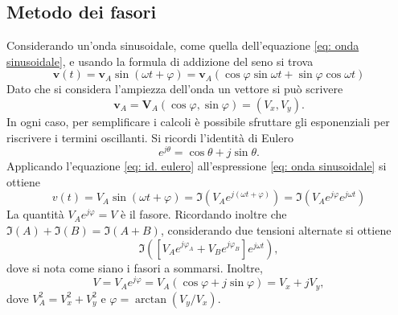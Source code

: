 \subsection{Metodo dei fasori}
Considerando un'onda sinusoidale, come quella dell'equazione \eqref{eq: onda sinusoidale}, e usando la formula di addizione del seno si trova
\begin{equation}
    \bm{v}(t)=\bm{v}_A\sin{(\omega t+\varphi)}=\bm{v}_A\left(\cos\varphi \sin{\omega t}+\sin{\varphi}\cos{\omega t}\right)
\end{equation}
Dato che si considera l'ampiezza dell'onda un vettore si può scrivere
\begin{equation}
    \bm{v}_A=\bm{V}_A(\cos{\varphi},\sin{\varphi})=(V_x,V_y).
\end{equation}
In ogni caso, per semplificare i calcoli è possibile sfruttare gli esponenziali per riscrivere i termini oscillanti. Si ricordi l'identità di Eulero
\begin{equation}
    \label{eq: id. eulero}
    e^{j\theta}=\cos\theta+j\sin{\theta}.
\end{equation}
Applicando l'equazione \eqref{eq: id. eulero} all'espressione \eqref{eq: onda sinusoidale} si ottiene
\begin{equation}
    v(t)=V_A\sin{(\omega t+\varphi)}=\Im\left(V_Ae^{j(\omega t+\varphi)}\right)=\Im\left(V_Ae^{j\varphi}e^{j\omega t}\right)
\end{equation}
La quantità $V_Ae^{j\varphi}=V$ è il fasore. Ricordando inoltre che $\Im(A)+\Im(B)=\Im(A+B)$, considerando due tensioni alternate si ottiene
\begin{equation}
    \Im\left(\left[V_Ae^{j\varphi_A}+V_Be^{j\varphi_B}\right]e^{j\omega t}\right),
\end{equation}
dove si nota come siano i fasori a sommarsi. Inoltre, 
\begin{equation}
    V=V_Ae^{j\varphi}=V_A(\cos{\varphi}+j\sin{\varphi})=V_x+jV_y,
\end{equation}
dove $V_A^2=V_x^2+V_y^2$ e $\varphi=\arctan{\left(V_y/V_x\right)}$.
